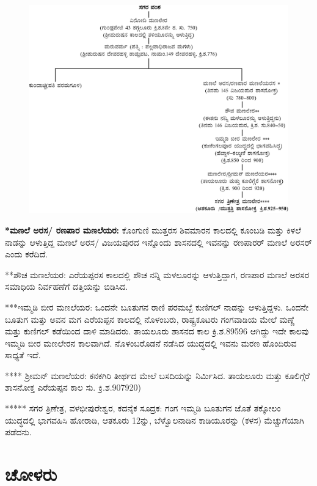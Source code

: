 \begin{figure}[!h]
\includegraphics{"images/chap2/1a.jpeg"}
\end{figure}

\textbf{*ಮಣಲೆ ಅರಸ/ ರಣಪಾರ ಮಣಲೆಯರ: } ಕೊಂಗುಣಿ ಮುತ್ತರಸ ಶಿವಮಾರನ ಕಾಲದಲ್ಲಿ ಕೂಂಬಡಿ ಮತ್ತು ಕಿಳಲೆ ನಾಡನ್ನು ಆಳುತ್ತಿದ್ದ ಮಣಲೆ ಅರಸ/ ವಿಜಯಪುರದ ಇನ್ನೊಂದು ಶಾಸನದಲ್ಲಿ ಇವನನ್ನು ರಣಪಾರರ್​ ಮಣಲೆ ಅರಸರ್​ ಎಂದು ಕರೆದಿದೆ. 

**ಶೌಚ ಮಣಲೆಯರ: ಎರೆಯಪ್ಪರಸ ಕಾಲದಲ್ಲಿ ಶೌಚ ನನ್ನಿ ಮಳಲೂರನ್ನು ಆಳುತ್ತಿದ್ದಾಗ, ರಣಪಾರ ಮಣಲೆ ಅರಸರ ಸಮಾಧಿಯ ನಿರ್ವಹಣೆಗೆ ದತ್ತಿಯನ್ನು ಬಿಡಿಸಿದ.

***ಇಮ್ಮಡಿ ಬೀರ ಮಣಲೆಯರ: ಒಂದನೇ ಬೂತುಗನ ರಾಣಿ ಪರಮಬ್ಬೆ ಕುಣಿಗಲ್​ ನಾಡನ್ನು ಆಳುತ್ತಿದ್ದಳು. ಒಂದನೇ ಬೂತುಗ ಮತ್ತು ಅವನ ಮಗ ಎರೆಯಪ್ಪನ ಕಾಲದಲ್ಲಿ ನೊಳಂಬರು, ರಾಷ್ಟ್ರಕೂಟರು ಗಂಗವಾಡಿಯ ಮೇಲೆ ಮಣ್ಣೆ ಮತ್ತು ಕುಣಿಗಲ್​ ಕಡೆಯಿಂದ ದಾಳಿ ಮಾಡಿದರು. ತಾಯಲೂರು ಶಾಸನದ ಕಾಲ ಕ್ರಿ.ಶ.89596 ಆಗಿದ್ದು ಇದೇ ಕಾಲವು ಇಮ್ಮಡಿ ಬೀರ ಮಣಲೇರನ ಕಾಲವಾಗಿದೆ. ನೊಳಂಬರೊಡನೆ ನಡೆಸಿದ ಯುದ್ಧದಲ್ಲಿ ಇವನು ಮರಣ ಹೊಂದಿರುವ ಸಾಧ್ಯತೆ ಇದೆ. 

\newpage

**** ಶ‍್ರೀಮನ್​ ಮಣಲೆಯರ: ಕನಕಗಿರಿ ತೀರ್ಥದ ಮೇಲೆ ಬಸದಿಯನ್ನು ನಿರ್ಮಿಸಿದ. ತಾಯಲೂರು ಮತ್ತು ಕೂಲಿಗ್ಗೆರೆ ಶಾಸನೋಕ್ತ ಎರೆಯಪ್ಪನ ಕಾಲ ಸು. ಕ್ರಿ.ಶ.907920) 

***** ಸಗರ ತ್ರಿಣೇತ್ರ, ವಳಭೀಪುರೇಶ್ವರ, ಕದನೈಕ ಸೂದ್ರಕ: ಗಂಗ ಇಮ್ಮಡಿ ಬೂತುಗನ ಜೊತೆ ತಕ್ಕೋಲಂ ಯುದ್ಧದಲ್ಲಿ ಭಾಗವಹಿಸಿ ಹೋರಾಡಿ, ಆತಕೂರು 12ನ್ನು, ಬೆಳ್ವೊಲನಾಡಿನ ಕಾಡಿಯೂರನ್ನು (ಕಳಸ) ಮೆಚ್ಚುಗೆಯಾಗಿ ಪಡೆದನು.


\section{ಚೋಳರು}

